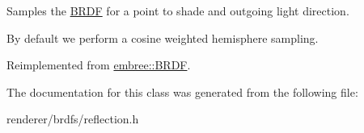 Samples the \hyperlink{classembree_1_1_b_r_d_f}{BRDF} for a point to shade and outgoing light direction. 

By default we perform a cosine weighted hemisphere sampling. 

Reimplemented from \hyperlink{classembree_1_1_b_r_d_f_a6eb1a114a4f36dc2c1ad65bcbce5f809}{embree::BRDF}.



The documentation for this class was generated from the following file:\begin{DoxyCompactItemize}
\item 
renderer/brdfs/reflection.h\end{DoxyCompactItemize}
